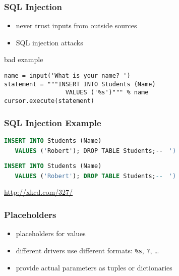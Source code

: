 \documentclass[dvipsnames]{beamer}
\theoremstyle{plain}
\begin{document}
\begin{frame}[fragile]
  \frametitle{SQL Injection}

  \begin{itemize}
    \item never trust inputs from outside sources
    \item \alert{SQL injection} attacks
  \end{itemize}

  \medskip
  \begin{exampleblock}{bad example}
    \begin{lstlisting}
name = input('What is your name? ')
statement = """INSERT INTO Students (Name)
                 VALUES ('%s')""" % name
cursor.execute(statement)
    \end{lstlisting}
  \end{exampleblock}
\end{frame}

\begin{frame}[fragile]
  \frametitle{SQL Injection Example}

  \begin{center}
  \end{center}

  \vspace{-6pt}
  \lstinline[language=SQL]!INSERT INTO Students (Name)!\\
  \lstinline[language=SQL]!   VALUES ('!\alert{\lstinline!Robert'); DROP TABLE Students;-- !}
  \lstinline[language=SQL]!')!

  \lstinline[language=SQL]!INSERT INTO Students (Name)!\\
  \lstinline[language=SQL]!   VALUES ('Robert'); DROP TABLE Students;-- !
  \lstinline[language=SQL]!')!

  \begin{tiny}
    \url{http://xkcd.com/327/}
  \end{tiny}
\end{frame}

\begin{frame}[fragile]
  \frametitle{Placeholders}

  \begin{itemize}
    \item placeholders for values
    \item different drivers use different formats:
      \lstinline!%s!, \lstinline!?!, \ldots
    \item provide actual parameters as tuples or dictionaries
  \end{itemize}
\end{frame}
\end{document}
